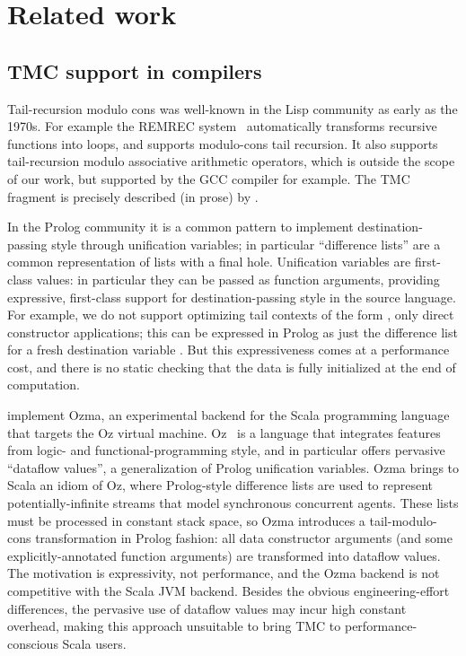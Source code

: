 \section{Related work}

\subsection{TMC support in compilers}

Tail-recursion modulo cons was well-known in the Lisp community as
early as the 1970s. For example the REMREC system~\citep*{risch-73}
automatically transforms recursive functions into loops, and
supports modulo-cons tail recursion. It also supports tail-recursion
modulo associative arithmetic operators, which is outside the scope
of our work, but supported by the GCC compiler for example. The TMC
fragment is precisely described (in prose) by \citet*{friedman-wise-75}.

In the Prolog community it is a common pattern to implement destination-passing style through unification variables; in particular ``difference lists'' are a common representation of lists with a final hole.
Unification variables are first-class values: in particular they can be passed as function arguments, providing expressive, first-class support for destination-passing style in the source language.
For example, we do not support optimizing tail contexts of the form , only direct constructor applications; this can be expressed in Prolog as just the difference list  for a fresh destination variable .
But this expressiveness comes at a performance cost, and there is no static checking that the data is fully initialized at the end of computation.

\citet*{tmc-scala-2013} implement Ozma, an experimental backend for
the Scala programming language that targets the Oz virtual machine.
Oz~\citep*{oz-1994,oz-1995} is a language that integrates features
from logic- and functional-programming style, and in particular offers
pervasive ``dataflow values'', a generalization of Prolog unification
variables. Ozma brings to Scala an idiom of Oz, where Prolog-style
difference lists are used to represent potentially-infinite streams
that model synchronous concurrent agents. These lists must be
processed in constant stack space, so Ozma introduces
a tail-modulo-cons transformation in Prolog fashion: all data
constructor arguments (and some explicitly-annotated
function arguments) are transformed into dataflow values. The
motivation is expressivity, not performance, and the Ozma backend is
not competitive with the Scala JVM backend. Besides the obvious
engineering-effort differences, the pervasive use of dataflow values
may incur high constant overhead, making this approach unsuitable to
bring TMC to performance-conscious Scala users.

